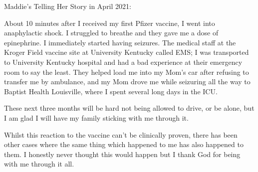 Maddie's Telling Her Story in April 2021:

About 10 minutes after I received my first Pfizer vaccine, I went into
anaphylactic shock. I struggled to breathe and they gave me a dose of
epinephrine. I immediately started having seizures. The medical staff at the
Kroger Field vaccine site at University Kentucky called EMS; I was transported
to University Kentucky hospital and had a bad experience at their emergency room
to say the least. They helped load me into my Mom’s car after refusing to
transfer me by ambulance, and my Mom drove me while seizuring all the way to
Baptist Health Louisville, where I spent several long days in the ICU.

These next three months will be hard not being allowed to drive, or be alone,
but I am glad I will have my family sticking with me through it.

Whilst this reaction to the vaccine can’t be clinically proven, there has been
other cases where the same thing which happened to me has also happened to
them. I honestly never thought this would happen but I thank God for being with
me through it all.


